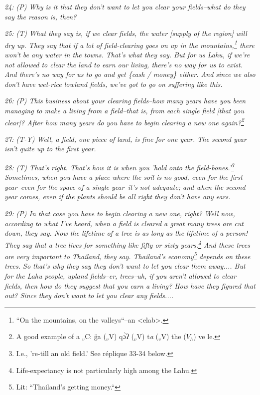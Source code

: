\textit{24: (P) Why is it that they don't want to let you clear your fields--what
do they say the reason is, then?}

\textit{25: (T) What they say is, if we clear fields, the water [supply of the
region] will dry up. They say that if a lot of field-clearing goes on up in the
mountains,\footnote{``On the mountains, on the valleys``--an <elab>.} there won't be any water in the towns. That's what they say. But
for us Lahu, if we're not allowed to clear the land to earn our living, there's
no way for us to exist. And there's no way for us to go and get \{cash / money\}
either. And since we also don't have wet-rice lowland fields, we've got to go on
suffering like this. }

\textit{26: (P) This business about your clearing fields--how many years have you
been managing to make a living from a field--that is, from each single field [that
you clear]? After how many years do you have to begin clearing a new one again?\footnote{A good example of a $_{v}$C: g̈a ($_{v}$V) qɔ̀ʔ ($_{v}$V) t\emph{a} ($_{v}$V) the ($V_h$) ve le.}}

\textit{27: (T-Y) Well, a field, one piece of land, is fine for one year. The second
year isn't quite up to the first year. }

\textit{28: (T) That's right. That's how it is when you 'hold onto the field-bones.'\footnote{I.e., 're-till an old field.' See réplique 33-34 below.}
Sometimes, when you have a place where the soil is no good, even for the first
year--even for the space of a single year--it's not adequate; and when the second
year comes, even if the plants should be all right they don't have any ears. }

\textit{29: (P) In that case you have to begin clearing a new one, right? Well
now, according to what I've heard, when a field is cleared a great many trees are
cut down, they say. Now the lifetime of a tree is as long as the lifetime of a
person! They say that a tree lives for something like fifty or sixty years.\footnote{Life-expectancy is not particularly high among the Lahu.}
And these trees are very important to Thailand, they say. Thailand's economy\footnote{Lit: ``Thailand's getting money.``}
depends on these trees. So that's why they say they don't want to let you clear
them away.... But for the Lahu people, upland fields--er, trees--uh, if you aren't
allowed to clear fields, then how do they suggest that you earn a living? How have
they figured that out? Since they don't want to let you clear any fields.... }

